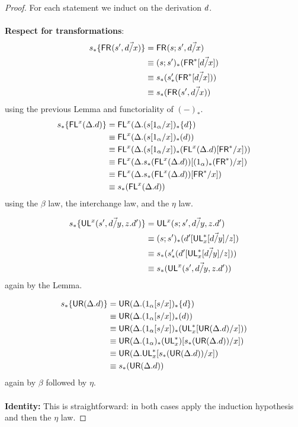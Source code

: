 \begin{proof}
For each statement we induct on the derivation $d$. \\~\\
\textbf{Respect for transformations}:
\begin{align*}
s_*\{\mathsf{FR}_{}(s',\vec{d/x})\} 
&= \mathsf{FR}_{}(s;s',\vec{d/x}) \\
&\equiv (s;s')_*(\mathsf{FR}^*[\vec{d/x}]) \\
&\equiv s_*(s'_*(\mathsf{FR}^*[\vec{d/x}])) \\
&\equiv s_*(\mathsf{FR}_{}(s',\vec{d/x}))
\end{align*}
using the previous Lemma and functoriality of $(-)_*$.
\begin{align*}
s_*\{\mathsf{FL}^{x}(\Delta.d)\} 
&= \mathsf{FL}^{x}(\Delta.(s[1_\alpha/x])_*\{d\}) \\
&\equiv \mathsf{FL}^{x}(\Delta.(s[1_\alpha/x])_*(d)) \\
&\equiv \mathsf{FL}^{x}(\Delta.(s[1_\alpha/x])_*(\mathsf{FL}^{x}(\Delta.d)[\mathsf{FR}^*/x]))\\
&\equiv \mathsf{FL}^{x}(\Delta. s_*(\mathsf{FL}^{x}(\Delta.d))[(1_\alpha)_*(\mathsf{FR}^*)/x])\\
&\equiv \mathsf{FL}^{x}(\Delta. s_*(\mathsf{FL}^{x}(\Delta.d))[\mathsf{FR}^*/x])\\
&\equiv s_*(\mathsf{FL}^{x}(\Delta.d)) 
\end{align*}
using the $\beta$ law, the interchange law, and the $\eta$ law.

\begin{align*}
s_*\{\mathsf{UL}^{x}_{}(s',\vec{d/y},z.d')\} 
&= \mathsf{UL}^{x}_{}(s;s',\vec{d/y},z.d') \\
&\equiv (s;s')_*(d'[\mathsf{UL}^*_{x}[\vec{d/y}]/z]) \\
&\equiv s_*(s'_*(d'[\mathsf{UL}^*_{x}[\vec{d/y}]/z])) \\
&\equiv s_*(\mathsf{UL}^{x}_{}(s',\vec{d/y},z.d')) 
\end{align*}
again by the Lemma.

\begin{align*}
s_*\{\mathsf{UR}(\Delta.d)\} 
&= \mathsf{UR}(\Delta.(1_\alpha[s/x])_*\{d\}) \\
&\equiv \mathsf{UR}(\Delta.(1_\alpha[s/x])_*(d)) \\
&\equiv \mathsf{UR}(\Delta.(1_\alpha[s/x])_*(\mathsf{UL}^*_{x}[\mathsf{UR}(\Delta.d)/x])) \\
&\equiv \mathsf{UR}(\Delta. (1_\alpha)_*(\mathsf{UL}^*_{x})[s_*(\mathsf{UR}(\Delta.d))/x]) \\
&\equiv \mathsf{UR}(\Delta. \mathsf{UL}^*_{x}[s_*(\mathsf{UR}(\Delta.d))/x]) \\
&\equiv s_*(\mathsf{UR}(\Delta.d))
\end{align*}
again by $\beta$ followed by $\eta$.
\\~\\
\textbf{Identity:} This is straightforward: in both cases apply the induction hypothesis and then the $\eta$ law.
 

\end{proof}
